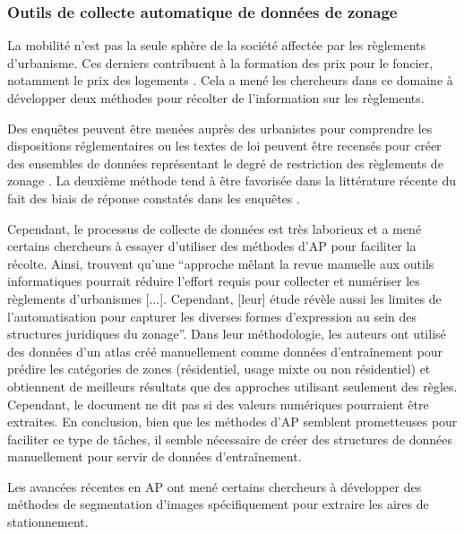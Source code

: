         \subsubsection{Outils de collecte automatique de données de zonage}
            La mobilité n'est pas la seule sphère de la société affectée par les règlements d'urbanisme. Ces derniers contribuent à la formation des prix pour le foncier, notamment le prix des logements \parencite{l_glaeser_why_2005,kok_land_2014}. Cela a mené les chercheurs dans ce domaine à développer deux méthodes pour récolter de l'information sur les règlements.\par  %
            Des enquêtes peuvent être menées auprès des urbanistes pour comprendre les dispositions réglementaires \parencite{pendall_growth_2018,gyourko_new_2008} ou les textes de loi peuvent être recensés pour créer des ensembles de données représentant le degré de restriction des règlements de zonage \parencite{xu_national_2023,dain_residential_2005,bronin_how_2023}. La deuxième méthode tend à être favorisée dans la littérature récente du fait des biais de réponse constatés dans les enquêtes \parencite{lewis_what_2019}.\par
            Cependant, le processus de collecte de données est très laborieux et a mené certains chercheurs à essayer d'utiliser des méthodes d'\ac{AP} pour faciliter la récolte. Ainsi,  \textcite{axelrod_automating_2023} trouvent qu'une \enquote{approche mêlant la revue manuelle aux outils informatiques pourrait réduire l'effort requis pour collecter et numériser les règlements d'urbanismes [...]. Cependant, [leur] étude révèle aussi les limites de l'automatisation pour capturer les diverses formes d'expression au sein des structures juridiques du zonage}. Dans leur méthodologie, les auteurs ont utilisé des données d'un atlas créé manuellement \parencite{bronin_how_2023} comme données d'entraînement pour prédire les catégories de zones (résidentiel, usage mixte ou non résidentiel) et obtiennent de meilleurs résultats que des approches utilisant seulement des règles. Cependant, le document ne dit pas si des valeurs numériques pourraient être extraites. En conclusion, bien que les méthodes d'\ac{AP} semblent prometteuses pour faciliter ce type de tâches, il semble nécessaire de créer des structures de données manuellement pour servir de données d'entraînement.\par
            Les avancées récentes en \ac{AP} ont mené certains chercheurs à développer des méthodes de segmentation d'images spécifiquement pour extraire les aires de stationnement.
